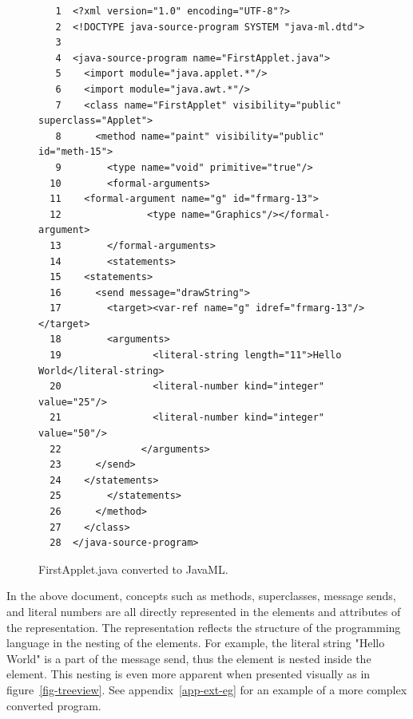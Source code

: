 \documentclass{article}
\begin{document}
\begin{figure}[htb]
\begin{verbatim}
   1  <?xml version="1.0" encoding="UTF-8"?>
   2  <!DOCTYPE java-source-program SYSTEM "java-ml.dtd">
   3  
   4  <java-source-program name="FirstApplet.java">
   5    <import module="java.applet.*"/>
   6    <import module="java.awt.*"/>
   7    <class name="FirstApplet" visibility="public" superclass="Applet">
   8      <method name="paint" visibility="public" id="meth-15">
   9        <type name="void" primitive="true"/>
  10        <formal-arguments>
  11    <formal-argument name="g" id="frmarg-13">
  12               <type name="Graphics"/></formal-argument>
  13        </formal-arguments>
  14        <statements>
  15    <statements>
  16      <send message="drawString">
  17        <target><var-ref name="g" idref="frmarg-13"/></target>
  18        <arguments>
  19                <literal-string length="11">Hello World</literal-string>
  20                <literal-number kind="integer" value="25"/>
  21                <literal-number kind="integer" value="50"/>
  22              </arguments>
  23      </send>
  24    </statements>
  25        </statements>
  26      </method>
  27    </class>
  28  </java-source-program>
\end{verbatim}
\caption{FirstApplet.java converted to JavaML.
\label{fig-firstapplet-javaml}}
\end{figure}

In the above document, concepts such as methods, superclasses, message
sends, and literal numbers are all directly represented in the elements
and attributes of the representation.  The representation reflects the
structure of the programming language in the nesting of the elements.
For example, the literal string "Hello World" is a part of the message
send, thus the  element is nested inside the
 element.  This nesting is even more apparent when
presented visually as in figure~\ref{fig-treeview}. See
appendix~\ref{app-ext-eg} for an example of a more complex converted
program.
\end{document}
